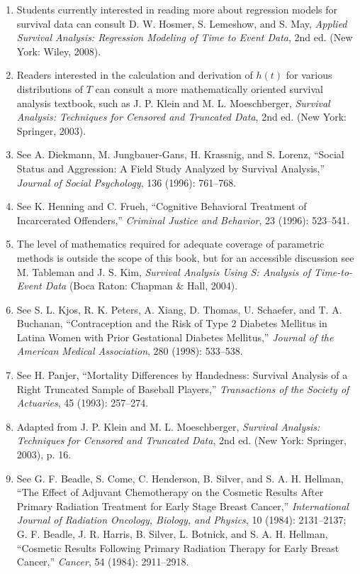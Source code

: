 \documentclass[
]{report}
\begin{document}
\begin{enumerate}
\item Students currently interested in reading more about regression models for survival data can consult D. W. Hosmer, S. Lemeshow, and S. May, \textit{Applied Survival Analysis: Regression Modeling of Time to Event Data}, 2nd ed. (New York: Wiley, 2008).
\item Readers interested in the calculation and derivation of $h(t)$ for various distributions of $T$ can consult a more mathematically oriented survival analysis textbook, such as J. P. Klein and M. L. Moeschberger, \textit{Survival Analysis: Techniques for Censored and Truncated Data}, 2nd ed. (New York: Springer, 2003).
\item See A. Diekmann, M. Jungbauer-Gans, H. Krassnig, and S. Lorenz, “Social Status and Aggression: A Field Study Analyzed by Survival Analysis,” \textit{Journal of Social Psychology}, 136 (1996): 761–768.
\item See K. Henning and C. Frueh, “Cognitive Behavioral Treatment of Incarcerated Offenders,” \textit{Criminal Justice and Behavior}, 23 (1996): 523–541.
\item The level of mathematics required for adequate coverage of parametric methods is outside the scope of this book, but for an accessible discussion see M. Tableman and J. S. Kim, \textit{Survival Analysis Using S: Analysis of Time-to-Event Data} (Boca Raton: Chapman \& Hall, 2004).
\item See S. L. Kjos, R. K. Peters, A. Xiang, D. Thomas, U. Schaefer, and T. A. Buchanan, “Contraception and the Risk of Type 2 Diabetes Mellitus in Latina Women with Prior Gestational Diabetes Mellitus,” \textit{Journal of the American Medical Association}, 280 (1998): 533–538.
\item See H. Panjer, “Mortality Differences by Handedness: Survival Analysis of a Right Truncated Sample of Baseball Players,” \textit{Transactions of the Society of Actuaries}, 45 (1993): 257–274.
\item Adapted from J. P. Klein and M. L. Moeschberger, \textit{Survival Analysis: Techniques for Censored and Truncated Data}, 2nd ed. (New York: Springer, 2003), p. 16.
\item See G. F. Beadle, S. Come, C. Henderson, B. Silver, and S. A. H. Hellman, “The Effect of Adjuvant Chemotherapy on the Cosmetic Results After Primary Radiation Treatment for Early Stage Breast Cancer,” \textit{International Journal of Radiation Oncology, Biology, and Physics}, 10 (1984): 2131–2137; G. F. Beadle, J. R. Harris, B. Silver, L. Botnick, and S. A. H. Hellman, “Cosmetic Results Following Primary Radiation Therapy for Early Breast Cancer,” \textit{Cancer}, 54 (1984): 2911–2918.

\end{enumerate}
\end{document}
